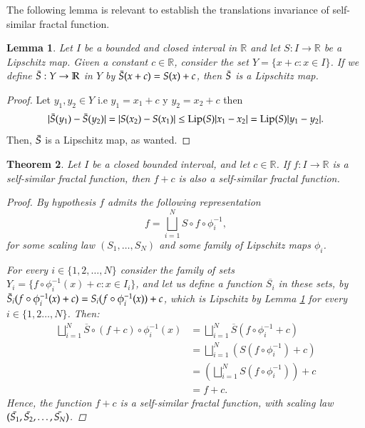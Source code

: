 \documentclass{amsart}
\newtheorem{theorem}{Theorem}[section]
\newtheorem{lemma}[theorem]{Lemma}
\newcommand{\R}{{\mathbb{R}}}
\begin{document}
 The following lemma is relevant to establish  the translations invariance of self-similar fractal function.
\begin{lemma}\label{translema}
Let $I$ be a bounded and closed interval in $\R$ and let  $S:I\rightarrow \R$  be a Lipschitz map. Given a constant $c\in \R$, consider the set $Y=\{x+c : x\in I\}$. If we define $\Bar{S}:Y\rightarrow \R$ in $Y$ by $\Bar{S}(x+c)=S(x)+c$, then $\Bar{S}$ is a Lipschitz map.
\end{lemma}
\begin{proof}
Let $y_1,y_2\in Y$ i.e $y_1=x_1+c$ y $y_2=x_2+c$ then
\begin{align*}
|\Bar{S}(y_1)-\Bar{S}(y_2)|
=|S(x_2)-S(x_1)|\leq \mathrm{Lip}(S)|x_1-x_2|=\mathrm{Lip}(S)|y_1-y_2|.
\end{align*} 
Then, $\Bar{S}$ is a Lipschitz map, as wanted.
\end{proof}
\begin{theorem}\label{trasl}
Let $I$ be a closed bounded interval, and let $c\in \R$. If $f:I\rightarrow \R$ is a self-similar fractal function, then  $f+c$ is also a self-similar fractal function.
\begin{proof}
By hypothesis $f$ admits the following  representation
\begin{equation*}
f=\bigsqcup^{N}_{i=1}S\circ f \circ \phi^{-1}_i,
\end{equation*}
for some scaling law $(S_1,\dots ,S_N)$ and some family of Lipschitz maps $\phi_i$.

For every $i\in \{1,2,\dots ,N\}$ consider the family of sets  $Y_i=\{f \circ \phi^{-1}_i(x)+c\colon x\in I_i\}$, and let us define a function $\overline{S_i}$ in these sets, by $\Bar{S}_i(f \circ \phi^{-1}_i(x)+c)
=S_i(f \circ \phi^{-1}_i(x))+c$, which is Lipschitz by Lemma \ref{translema} for every $i\in \{1,2\dots ,N\}$. Then:
\begin{align*}
\bigsqcup^{N}_{i=1}\overline{S}\circ (f+c) \circ \phi^{-1}_i(x)
&=\bigsqcup^{N}_{i=1}\overline{S}(f \circ \phi^{-1}_i+c)\\
&=\bigsqcup^{N}_{i=1} \left(S(f \circ \phi^{-1}_i)+c\right)\\
&=\left(\bigsqcup^{N}_{i=1} S(f \circ \phi^{-1}_i)\right)+c\\
&=f+c.
\end{align*}
Hence, the function $f+c$ is a self-similar fractal function, with scaling law $(\Bar{S_1},\Bar{S_2},\dots,\Bar{S_N})$.
\end{proof}
\end{theorem}
\end{document}

